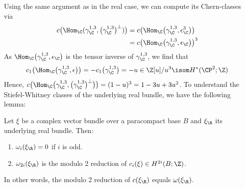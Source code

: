 Using the same argument as in the real case, we can compute its Chern-classes via
\begin{align*}
	c\big(\Hom_\C(\gamma_\C^{1, 3}, \big(\gamma_\C^{1, 3}\big)^\perp)\big) &= c\big(\Hom_\C\big(\gamma_\C^{1, 3}, \epsilon_\C^3\big)\big) \\
														   				   &= c\big(\Hom_\C\big(\gamma_\C^{1, 3}, \epsilon_\C\big)\big)^3
\end{align*}
As $\Hom_\C\big(\gamma_\C^{1, 3}, \epsilon_\C\big)$ is the tensor inverse of $\gamma_\C^{1, 3}$, we find that
\begin{equation*}
	c_1\big(\Hom_\C\big(\gamma_\C^{1, 3}, \epsilon\big)\big) = -c_1\big(\gamma_\C^{1, 3}\big) = -u \in \Z[u] / u^3 \isom H^*(\CP^2; \Z)
\end{equation*}
Hence, $c\big(\Hom_\C\big(\gamma_\C^{1, 3}, \big(\gamma_\C^{1, 3}\big)^\perp\big)\big) = (1 - u)^3 = 1 - 3u + 3u^2$.
To understand the Stiefel-Whitney classes of the underlying real bundle, we have the following lemma:
\begin{lemma}
	Let $\xi$ be a complex vector bundle over a paracompact base $B$ and $\xi_\R$ its underlying real bundle.
	Then:
	\begin{enumerate}
		\item\label{lma:swofcomplexbundle:1} $\omega_i(\xi_\R) = 0$ if $i$ is odd.
		\item\label{lma:swofcomplexbundle:2} $\omega_{2i}(\xi_\R)$ is the modulo 2 reduction of $c_i(\xi) \in H^{2i}(B; \Z)$.
	\end{enumerate}
\end{lemma}
In other words, the modulo 2 reduction of $c(\xi_\R)$ equals $\omega(\xi_\R)$.
